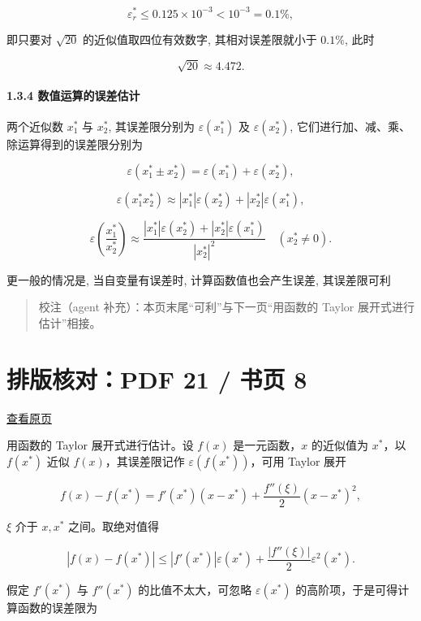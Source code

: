 \documentclass[
  10pt,
  a4paper,
]{article}
\begin{document}
\[
\varepsilon_r^* \leqslant 0.125 \times 10^{-3} < 10^{-3} = 0.1\%,
\]

即只要对 \(\sqrt{20}\) 的近似值取四位有效数字, 其相对误差限就小于
\(0.1\%\), 此时

\[
\sqrt{20} \approx 4.472.
\]

\paragraph{1.3.4
数值运算的误差估计}\label{ux6570ux503cux8fd0ux7b97ux7684ux8befux5deeux4f30ux8ba1}

两个近似数 \(x_1^*\) 与 \(x_2^*\), 其误差限分别为 \(\varepsilon(x_1^*)\)
及 \(\varepsilon(x_2^*)\), 它们进行加、减、乘、除运算得到的误差限分别为

\[
\varepsilon(x_1^* \pm x_2^*) = \varepsilon(x_1^*) + \varepsilon(x_2^*),
\]

\[
\varepsilon(x_1^* x_2^*) \approx |x_1^*| \varepsilon(x_2^*) + |x_2^*| \varepsilon(x_1^*),
\]

\[
\varepsilon\left(\frac{x_1^*}{x_2^*}\right) \approx \frac{|x_1^*| \varepsilon(x_2^*) + |x_2^*| \varepsilon(x_1^*)}{|x_2^*|^2} \quad (x_2^* \neq 0).
\]

更一般的情况是, 当自变量有误差时, 计算函数值也会产生误差, 其误差限可利

\begin{quote}
校注（agent 补充）：本页末尾``可利''与下一页``用函数的 Taylor
展开式进行估计''相接。
\end{quote}

\newpage

\section{排版核对：PDF 21 / 书页
8}\label{ux6392ux7248ux6838ux5bf9pdf-21-ux4e66ux9875-8}

\href{../../../source-images/pdf-021.jpeg}{查看原页}

用函数的 Taylor 展开式进行估计。设 \(f(x)\) 是一元函数，\(x\) 的近似值为
\(x^*\)，以 \(f(x^*)\) 近似 \(f(x)\)，其误差限记作
\(\varepsilon(f(x^*))\)，可用 Taylor 展开

\[
f(x)-f(x^*)=f'(x^*)(x-x^*)+\frac{f''(\xi)}{2}(x-x^*)^2,
\]

\(\xi\) 介于 \(x,x^*\) 之间。取绝对值得

\[
|f(x)-f(x^*)|\leqslant |f'(x^*)|\varepsilon(x^*)+\frac{|f''(\xi)|}{2}\varepsilon^2(x^*).
\]

假定 \(f'(x^*)\) 与 \(f''(x^*)\) 的比值不太大，可忽略
\(\varepsilon(x^*)\) 的高阶项，于是可得计算函数的误差限为
\end{document}
